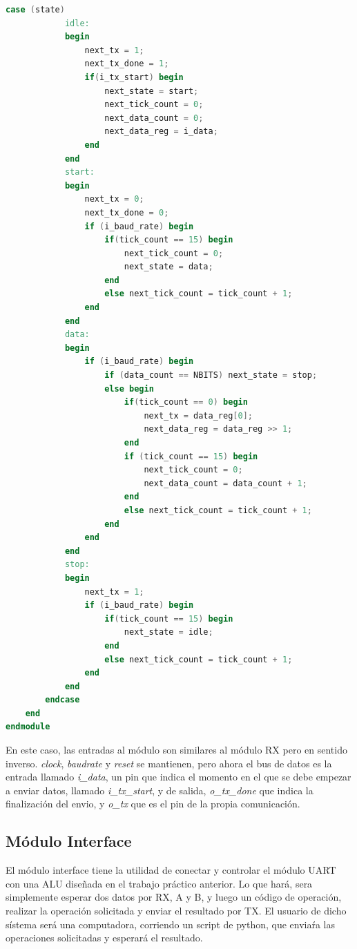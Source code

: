 \documentclass{article}
\begin{document}
\begin{lstlisting}[language=Verilog]
        case (state)  
            idle:
            begin
                next_tx = 1;
                next_tx_done = 1;
                if(i_tx_start) begin
                    next_state = start;
                    next_tick_count = 0;
                    next_data_count = 0;
                    next_data_reg = i_data;
                end
            end
            start:
            begin
                next_tx = 0;
                next_tx_done = 0;
                if (i_baud_rate) begin
                    if(tick_count == 15) begin
                        next_tick_count = 0;
                        next_state = data;
                    end
                    else next_tick_count = tick_count + 1;
                end
            end
            data:
            begin
                if (i_baud_rate) begin
                    if (data_count == NBITS) next_state = stop;
                    else begin
                        if(tick_count == 0) begin
                            next_tx = data_reg[0];
                            next_data_reg = data_reg >> 1;
                        end
                        if (tick_count == 15) begin
                            next_tick_count = 0;
                            next_data_count = data_count + 1;
                        end
                        else next_tick_count = tick_count + 1;
                    end
                end
            end
            stop:
            begin
                next_tx = 1;
                if (i_baud_rate) begin
                    if(tick_count == 15) begin
                        next_state = idle;
                    end
                    else next_tick_count = tick_count + 1;
                end
            end
        endcase
    end
endmodule
\end{lstlisting}

En este caso, las entradas al módulo son similares al módulo RX pero en sentido inverso. \textit{clock}, \textit{baudrate} y \textit{reset} se mantienen, pero ahora el bus de datos es la entrada llamado \textit{i\_data}, un pin que indica el momento en el que se debe empezar a enviar datos, llamado \textit{i\_tx\_start}, y de salida, \textit{o\_tx\_done} que indica la finalización del envio, y \textit{o\_tx} que es el pin de la propia comunicación.

\subsection{Módulo Interface}

El módulo interface tiene la utilidad de conectar y controlar el módulo UART con una ALU diseñada en el trabajo práctico
anterior. Lo que hará, sera simplemente esperar dos datos por RX, A y B, y luego un código de operación, realizar la operación solicitada
y enviar el resultado por TX. El usuario de dicho sístema será una computadora, corriendo un script de python, que enviaŕa las operaciones solicitadas y esperará el resultado.
\end{document}
